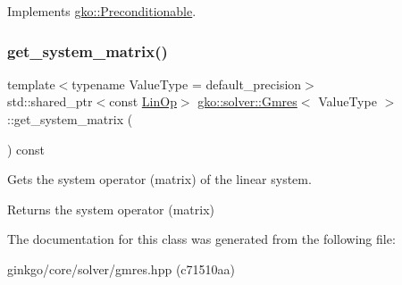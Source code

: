 Implements \hyperlink{classgko_1_1Preconditionable_ad9545089aef0dfc83bc7a74e5bf1d748}{gko\+::\+Preconditionable}.

\mbox{\label{classgko_1_1solver_1_1Gmres_a31d5c0225dbed72e52ea252dd38868f2}} 
\subsubsection{\texorpdfstring{get\+\_\+system\+\_\+matrix()}{get\_system\_matrix()}}
{\footnotesize\ttfamily template$<$typename Value\+Type  = default\+\_\+precision$>$ \\
std\+::shared\+\_\+ptr$<$const \hyperlink{classgko_1_1LinOp}{Lin\+Op}$>$ \hyperlink{classgko_1_1solver_1_1Gmres}{gko\+::solver\+::\+Gmres}$<$ Value\+Type $>$\+::get\+\_\+system\+\_\+matrix (\begin{DoxyParamCaption}{ }\end{DoxyParamCaption}) const\hspace{0.3cm}{\ttfamily [inline]}}



Gets the system operator (matrix) of the linear system. 

\begin{DoxyReturn}{Returns}
the system operator (matrix) 
\end{DoxyReturn}


The documentation for this class was generated from the following file\+:\begin{DoxyCompactItemize}
\item 
ginkgo/core/solver/gmres.\+hpp (c71510aa)\end{DoxyCompactItemize}
